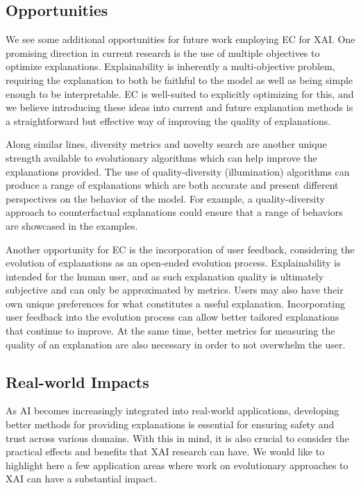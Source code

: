 \documentclass[graybox]{svmult}
\begin{document}
\subsection{Opportunities}

We see some additional opportunities for future work employing EC for XAI. One promising direction in current research is the use of multiple objectives to optimize explanations. Explainability is inherently a multi-objective problem, requiring the explanation to both be faithful to the model as well as being simple enough to be interpretable. EC is well-suited to explicitly optimizing for this, and we believe introducing these ideas into current and future explanation methods is a straightforward but effective way of improving the quality of explanations.

Along similar lines, diversity metrics and novelty search are another unique strength available to evolutionary algorithms which can help improve the explanations provided. The use of quality-diversity (illumination) algorithms can produce a range of explanations which are both accurate and present different perspectives on the behavior of the model. 
For example, a quality-diversity approach to counterfactual explanations could ensure that a range of behaviors are showcased in the examples.

Another opportunity for EC is the incorporation of user feedback, considering the evolution of explanations as an open-ended evolution process. Explainability is intended for the human user, and as such explanation quality is ultimately subjective and can only be approximated by metrics. Users may also have their own unique preferences for what constitutes a useful explanation. Incorporating user feedback into the evolution process can allow better tailored explanations that continue to improve. At the same time, better metrics for measuring the quality of an explanation are also necessary in order to not overwhelm the user.

\subsection{Real-world Impacts}

As AI becomes increasingly integrated into real-world applications, developing better methods for providing explanations is essential for ensuring safety and trust across various domains. With this in mind, it is also crucial to consider the practical effects and benefits that XAI research can have. We would like to highlight here a few application areas where work on evolutionary approaches to XAI can have a substantial impact.
\end{document}
